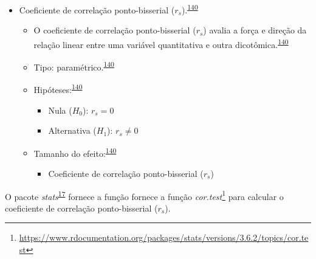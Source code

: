 \documentclass[
]{book}
\providecommand{\tightlist}{%
  \setlength{\itemsep}{0pt}\setlength{\parskip}{0pt}}
\renewcommand{\href}[2]{#2\footnote{\url{#1}}}
\newenvironment{infobox}[1]
  {
  \begin{itemize}
  \renewcommand{\labelitemi}{
    \raisebox{-.7\height}[0pt][0pt]{
      {\setkeys{Gin}{width=3em,keepaspectratio}
        \texttt{[image: \#1]}}
    }
  }
  \setlength{\fboxsep}{1em}
  \begin{blackbox}
  \item
  }
  {
  \end{blackbox}
  \end{itemize}
  }
\begin{document}
\begin{itemize}
\item
  Coeficiente de correlação ponto-bisserial (\(r_{s}\)).\textsuperscript{\protect\hyperlink{ref-khamis2008}{140}}

  \begin{itemize}
  \item
    O coeficiente de correlação ponto-bisserial (\(r_{s}\)) avalia a força e direção da relação linear entre uma variável quantitativa e outra dicotômica.\textsuperscript{\protect\hyperlink{ref-khamis2008}{140}}
  \item
    Tipo: paramétrico.\textsuperscript{\protect\hyperlink{ref-khamis2008}{140}}
  \item
    Hipóteses:\textsuperscript{\protect\hyperlink{ref-khamis2008}{140}}

    \begin{itemize}
    \item
      Nula (\(H_{0}\)): \(r_{s}=0\)
    \item
      Alternativa (\(H_{1}\)): \(r_{s}≠0\)
    \end{itemize}
  \item
    Tamanho do efeito:\textsuperscript{\protect\hyperlink{ref-khamis2008}{140}}

    \begin{itemize}
    \tightlist
    \item
      Coeficiente de correlação ponto-bisserial (\(r_{s}\))
    \end{itemize}
  \end{itemize}
\end{itemize}

\begin{infobox}{images/Rlogo}
O pacote \emph{stats}\textsuperscript{\protect\hyperlink{ref-stats-2}{17}} fornece a função fornece a função \href{https://www.rdocumentation.org/packages/stats/versions/3.6.2/topics/cor.test}{\emph{cor.test}} para calcular o coeficiente de correlação ponto-bisserial (\(r_{s}\)).

\end{infobox}
\end{document}
